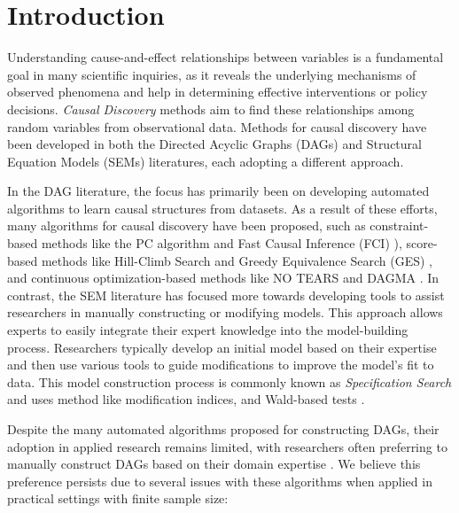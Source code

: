 \documentclass{uai2025} %
\begin{document}
\section{Introduction}

Understanding cause-and-effect relationships between variables is a fundamental
goal in many scientific inquiries, as it reveals the underlying mechanisms of
observed phenomena and help in determining effective interventions or policy
decisions. \emph{Causal Discovery} methods aim to find these relationships
among random variables from observational data. Methods for causal discovery
have been developed in both the Directed Acyclic Graphs (DAGs) and Structural
Equation Models (SEMs) literatures, each adopting a different approach. 

In the DAG literature, the focus has primarily been on developing automated
algorithms to learn causal structures from datasets. As a result of these
efforts, many algorithms for causal discovery have been proposed, such as
constraint-based methods like the PC algorithm \citep{Spirtes2001} and Fast
Causal Inference (FCI) \citep{Spirtes2000}), score-based methods like
Hill-Climb Search and Greedy Equivalence Search (GES) \citep{Chickering2002},
and continuous optimization-based methods like NO TEARS \citep{Zheng2018} and
DAGMA \citep{Bello2022}. In contrast, the SEM literature has focused more
towards developing tools to assist researchers in manually constructing or
modifying models. This approach allows experts to easily integrate their expert
knowledge into the model-building process. Researchers typically develop an
initial model based on their expertise and then use various tools to guide
modifications to improve the model's fit to data. This model construction
process is commonly known as \emph{Specification Search} \citep{Long1983} and
uses method like modification indices, and Wald-based tests
\citep{Marcoulides2018}.

Despite the many automated algorithms proposed for constructing DAGs, their
adoption in applied research remains limited, with researchers often preferring
to manually construct DAGs based on their domain expertise \citep{Tennant2020,
Petersen2021}. We believe this preference persists due to several issues with
these algorithms when applied in practical settings with finite sample size:
\end{document}
